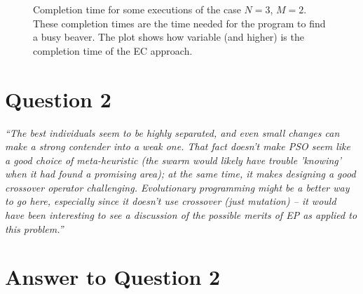 \begin{figure}[t]
\centering
{}
\caption[]{Completion time for some executions of the case $N=3$, $M=2$. These completion times are the time needed for the program to find a busy beaver. The plot shows how variable (and higher) is the completion time of the EC approach.}
\label{plot:rnd}
\end{figure}




\section*{Question 2}
\emph{``The best individuals seem to be highly separated, and even small
    changes can make a strong contender into a weak one. That fact
    doesn't make PSO seem like a good choice of meta-heuristic (the
    swarm would likely have trouble 'knowing' when it had found a
    promising area); at the same time, it makes designing a good
    crossover operator challenging. Evolutionary programming might be a
    better way to go here, especially since it doesn't use crossover
    (just mutation) -- it would have been interesting to see a
    discussion of the possible merits of EP as applied to this problem.''}

\section*{Answer to Question 2}

